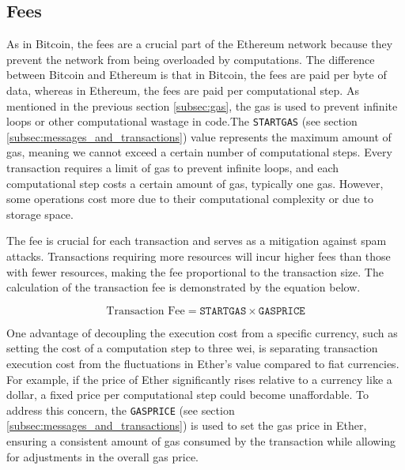 
\subsection{Fees}
\label{subsec:fees}


As in Bitcoin, the fees are a crucial part of the Ethereum network because they prevent the network from being overloaded by computations. The difference between Bitcoin 
and Ethereum is that in Bitcoin, the fees are paid per byte of data, whereas in Ethereum, the fees are paid per computational step. As mentioned in the previous section 
\ref{subsec:gas}, the gas is used to prevent infinite loops or other computational wastage in code.The \texttt{STARTGAS} (see section \ref{subsec:messages_and_transactions}) 
value represents the maximum amount of gas, meaning we cannot exceed a certain number of computational steps. Every transaction requires a limit of gas to prevent infinite loops, and each computational step costs a certain 
amount of gas, typically one gas. However, some operations cost more due to their computational complexity or due to storage space.

The fee is crucial for each transaction and serves as a mitigation against spam attacks. 
Transactions requiring more resources will incur higher fees than those with fewer resources, making the fee proportional to the transaction size. The calculation of the transaction fee is demonstrated by the equation below.


\begin{equation}
   \label{eq:transaction_fee}
   \text{Transaction Fee} = \texttt{STARTGAS} \times \texttt{GASPRICE}
\end{equation}


One advantage of decoupling the execution cost from a specific currency, such as setting the cost of a computation step to three wei, is separating transaction 
execution cost from the fluctuations in Ether's value compared to fiat currencies. For example, if the price of Ether significantly rises relative to a currency like a 
dollar, a fixed price per computational step could become unaffordable. To address this concern, the \texttt{GASPRICE} (see section \ref{subsec:messages_and_transactions}) 
is used to set the gas price in Ether, ensuring a consistent amount of gas consumed by the transaction while allowing for adjustments in the overall gas price.

